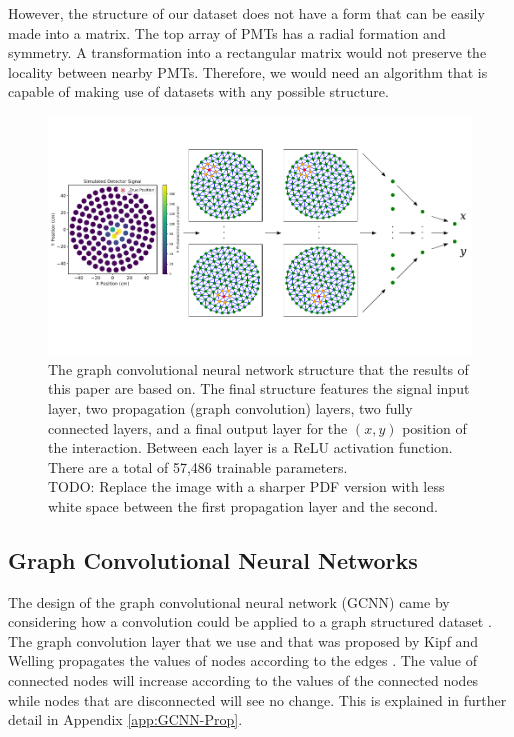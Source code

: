 \documentclass[thesis.tex]{subfiles}
\begin{document}
\par However, the structure of our dataset does not have a form that can be easily made into a matrix.
The top array of PMTs has a radial formation and symmetry.
A transformation into a rectangular matrix would not preserve the locality between nearby PMTs.
Therefore, we would need an algorithm that is capable of making use of datasets with any possible structure.
\begin{figure}[t]
	\centering
	\includegraphics[width=\linewidth]{figures/gcnn_architecture.pdf}
	\caption{
	The graph convolutional neural network structure that the results of this paper are based on.
	The final structure features the signal input layer, two propagation (graph convolution) layers, two fully connected layers, and a final output layer for the $(x,y)$ position of the interaction.
	Between each layer is a ReLU activation function.
	There are a total of 57,486 trainable parameters.
	\\ TODO: Replace the image with a sharper PDF version with less white space between the first propagation layer and the second.
	}
	\label{fig:figures/GCNN_Structure}
\end{figure}
\subsection{Graph Convolutional Neural Networks}\label{subsec:GCNN}
The design of the graph convolutional neural network (GCNN) came by considering how a convolution could be applied to a graph structured dataset \cite{GCNN_Kipf}.
The graph convolution layer that we use and that was proposed by Kipf and Welling propagates the values of nodes according to the edges \cite{GCNN_Kipf}.
The value of connected nodes will increase according to the values of the connected nodes while nodes that are disconnected will see no change.
This is explained in further detail in Appendix \ref{app:GCNN-Prop}.
\end{document}
